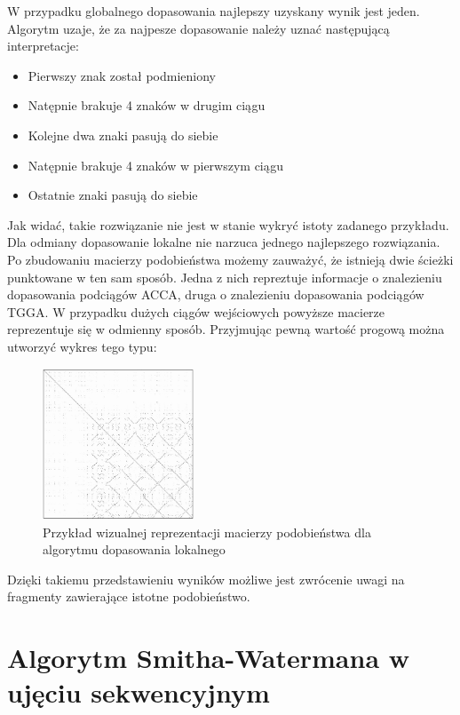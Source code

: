 \documentclass[a4paper,12pt]{article}
\newenvironment{lista}{
\begin{itemize}
  \setlength{\itemsep}{1pt}
  \setlength{\parskip}{0pt}
  \setlength{\parsep}{0pt}
}{\end{itemize}}
\begin{document}
W przypadku globalnego dopasowania najlepszy uzyskany wynik jest jeden. Algorytm uzaje, że za najpesze dopasowanie należy uznać następującą interpretacje: 
\begin{lista}
 \item Pierwszy znak został podmieniony
\item Natępnie brakuje 4 znaków w drugim ciągu
\item Kolejne dwa znaki pasują do siebie
\item Natępnie brakuje 4 znaków w pierwszym ciągu
\item Ostatnie znaki pasują do siebie
\end{lista}

Jak widać, takie rozwiązanie nie jest w stanie wykryć istoty zadanego przykładu. Dla odmiany dopasowanie lokalne nie narzuca jednego najlepszego rozwiązania. Po zbudowaniu macierzy podobieństwa możemy zauważyć, że istnieją dwie ścieżki punktowane w ten sam sposób. Jedna z nich repreztuje informacje o znalezieniu dopasowania podciągów ACCA, druga o znalezieniu dopasowania podciągów TGGA. W przypadku dużych ciągów wejściowych powyższe macierze reprezentuje się w odmienny sposób. Przyjmując pewną wartość progową można utworzyć wykres tego typu:

\begin{figure}[H]
  \vspace{5pt}
  \centering
  \begin{center}
  \includegraphics[width=0.4\textwidth]{images/macierz.png}
  \end{center}
  \caption{Przykład wizualnej reprezentacji macierzy podobieństwa dla algorytmu dopasowania lokalnego}
\end{figure}

Dzięki takiemu przedstawieniu wyników możliwe jest zwrócenie uwagi na fragmenty zawierające istotne podobieństwo. 


\section*{Algorytm Smitha-Watermana w ujęciu sekwencyjnym}
\end{document}
